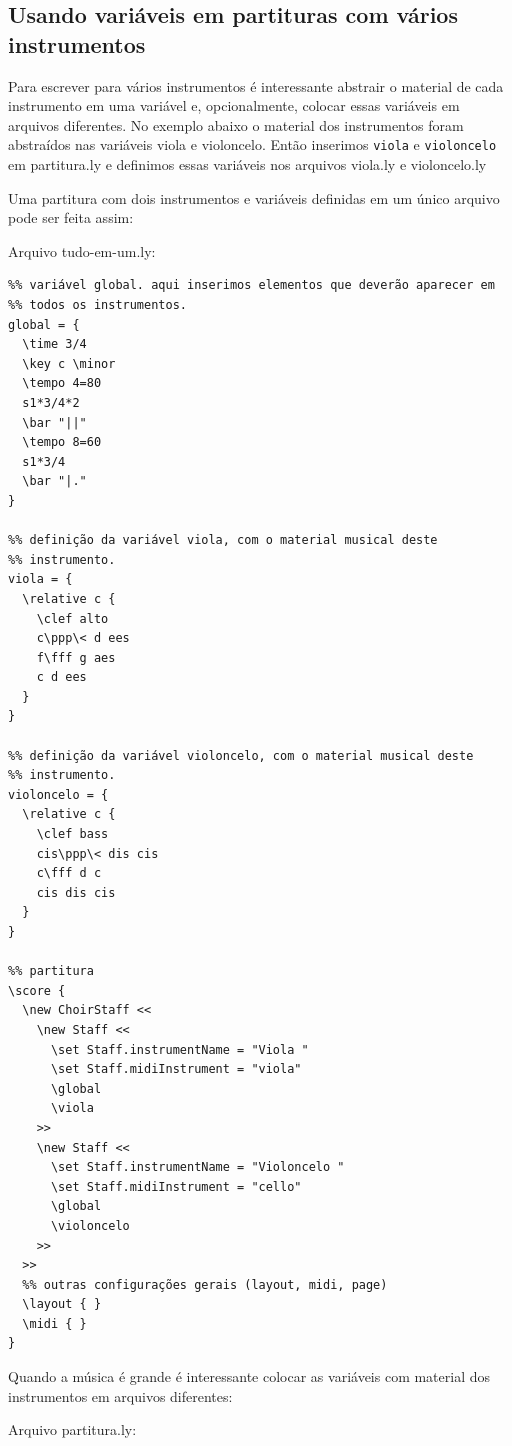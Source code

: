 \documentclass[12pt,brazil]{book}
\begin{document}
\subsection{Usando variáveis em partituras com vários instrumentos}
\label{sec:usando-variaveis-em}

Para escrever para vários instrumentos é interessante abstrair o
material de cada instrumento em uma variável e, opcionalmente, colocar
essas variáveis em arquivos diferentes. No exemplo abaixo o material
dos instrumentos foram abstraídos nas variáveis viola e
violoncelo. Então inserimos \texttt{viola} e \texttt{violoncelo} em
partitura.ly e definimos essas variáveis nos arquivos viola.ly e
violoncelo.ly

Uma partitura com dois instrumentos e variáveis definidas em um único
arquivo pode ser feita assim:

Arquivo tudo-em-um.ly:

\begin{verbatim}
%% variável global. aqui inserimos elementos que deverão aparecer em
%% todos os instrumentos.
global = {
  \time 3/4
  \key c \minor
  \tempo 4=80
  s1*3/4*2
  \bar "||"
  \tempo 8=60
  s1*3/4
  \bar "|."
}

%% definição da variável viola, com o material musical deste
%% instrumento.
viola = {
  \relative c {
    \clef alto
    c\ppp\< d ees
    f\fff g aes
    c d ees
  }
}

%% definição da variável violoncelo, com o material musical deste
%% instrumento.
violoncelo = {
  \relative c {
    \clef bass
    cis\ppp\< dis cis
    c\fff d c
    cis dis cis
  }
}

%% partitura
\score {
  \new ChoirStaff <<
    \new Staff <<
      \set Staff.instrumentName = "Viola "
      \set Staff.midiInstrument = "viola"
      \global
      \viola
    >>
    \new Staff <<
      \set Staff.instrumentName = "Violoncelo "
      \set Staff.midiInstrument = "cello"
      \global
      \violoncelo
    >>
  >>
  %% outras configurações gerais (layout, midi, page)
  \layout { }
  \midi { }
}
\end{verbatim}

Quando a música é grande é interessante colocar as variáveis com
material dos instrumentos em arquivos diferentes:

Arquivo partitura.ly:
\end{document}
